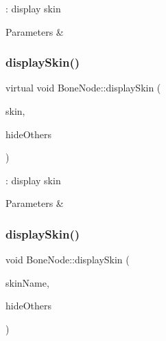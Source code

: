 \+: display skin 


\begin{DoxyParams}{Parameters}
{\em } & \\
\hline
\end{DoxyParams}
\mbox{\label{classBoneNode_a730ebd5ea4691c060ab642fc7f0c7f1b}} 
\subsubsection{\texorpdfstring{display\+Skin()}{displaySkin()}\hspace{0.1cm}{\footnotesize\ttfamily [2/4]}}
{\footnotesize\ttfamily virtual void Bone\+Node\+::display\+Skin (\begin{DoxyParamCaption}\item[{Skin\+Node $\ast$}]{skin,  }\item[{bool}]{hide\+Others }\end{DoxyParamCaption})\hspace{0.3cm}{\ttfamily [virtual]}}



\+: display skin 


\begin{DoxyParams}{Parameters}
{\em } & \\
\hline
\end{DoxyParams}
\mbox{\label{classBoneNode_a809d5e743bf5003db0421bdeaeeb1925}} 
\subsubsection{\texorpdfstring{display\+Skin()}{displaySkin()}\hspace{0.1cm}{\footnotesize\ttfamily [3/4]}}
{\footnotesize\ttfamily void Bone\+Node\+::display\+Skin (\begin{DoxyParamCaption}\item[{const std\+::string \&}]{skin\+Name,  }\item[{bool}]{hide\+Others }\end{DoxyParamCaption})\hspace{0.3cm}{\ttfamily [virtual]}}



